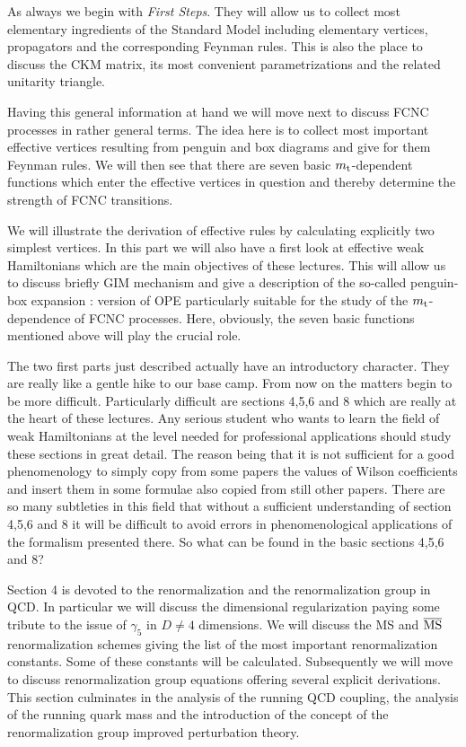 \documentclass[12pt]{article}
\newcommand{\mt}{m_{\rm t}}
\begin{document}
As always we begin with {\it First Steps}. They will allow us to collect most
elementary ingredients of the Standard Model including elementary vertices,
propagators and the corresponding Feynman rules. This is also the place to
discuss the CKM matrix, its most convenient parametrizations and the related
unitarity triangle.

Having this general information at hand we will move next to discuss FCNC
processes in rather general terms. The idea here is to collect most important
effective vertices resulting from penguin and box diagrams and give for them
Feynman rules. We will then see that there are seven basic $\mt$-dependent
functions which enter the effective vertices in question and thereby
determine the strength of FCNC transitions. 

We will illustrate  the derivation of effective
rules by calculating explicitly two simplest vertices. 
In this part we will also have a first look at effective weak
Hamiltonians which are the main objectives of these lectures. This will allow
us to discuss briefly GIM mechanism \cite{GIM1} 
and give a description of the so-called
penguin-box expansion \cite{PBE0}: 
version of OPE particularly suitable for the study of
the $\mt$-dependence of FCNC processes. Here, obviously, the seven basic
functions mentioned above will play the crucial role.

The two first parts just described actually have an introductory character.
They are really like a gentle hike to our base  camp. From now on the matters
begin to be more difficult. Particularly difficult are sections 4,5,6 and 8
which are really at the heart of these lectures. Any serious student who
wants to learn the field of weak Hamiltonians at the level needed for
professional applications should study these sections in great detail. The
reason being that it is not sufficient for a good phenomenology to simply copy
from some papers the values of Wilson coefficients and insert them in some
formulae also copied from still other papers. There are so many subtleties in
this field that without a sufficient understanding of section 4,5,6 and 8 it
will be difficult to avoid errors in phenomenological applications of the
formalism presented there. So what can be found in the basic sections 4,5,6
and 8?

Section 4 is devoted to the renormalization and the renormalization group in
QCD. In particular we will discuss the dimensional regularization paying some
tribute to the issue of $\gamma_5$ in $D\not=4$ dimensions. We will discuss 
the MS and ${\rm \overline{MS}}$
renormalization schemes giving the list of the most important renormalization
constants. Some of these constants will be calculated. Subsequently we will
move to discuss renormalization group equations offering several explicit
derivations. This section culminates in the analysis of the running QCD
coupling, the analysis of the running quark mass and the introduction of
the concept of the renormalization group improved perturbation theory. 
\end{document}
